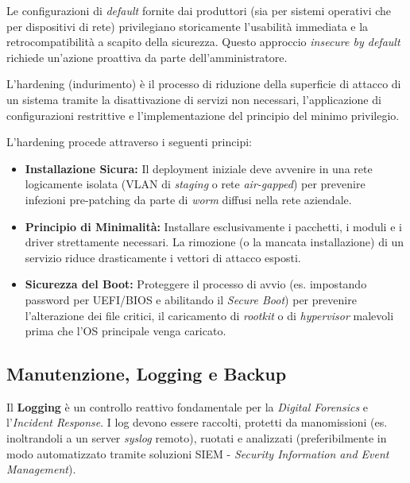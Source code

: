 \begin{notebox}
Le configurazioni di \textit{default} fornite dai produttori (sia per sistemi operativi che per dispositivi di rete) privilegiano storicamente l'usabilità immediata e la retrocompatibilità a scapito della sicurezza. Questo approccio \textit{insecure by default} richiede un'azione proattiva da parte dell'amministratore.
\end{notebox}

\begin{defbox}[Hardening]
L'hardening (indurimento) è il processo di riduzione della superficie di attacco di un sistema tramite la disattivazione di servizi non necessari, l'applicazione di configurazioni restrittive e l'implementazione del principio del minimo privilegio.
\end{defbox}

L'hardening procede attraverso i seguenti principi:
\begin{itemize}
    \item \textbf{Installazione Sicura:} Il deployment iniziale deve avvenire in una rete logicamente isolata (VLAN di \textit{staging} o rete \textit{air-gapped}) per prevenire infezioni pre-patching da parte di \textit{worm} diffusi nella rete aziendale.
    \item \textbf{Principio di Minimalità:} Installare esclusivamente i pacchetti, i moduli e i driver strettamente necessari. La rimozione (o la mancata installazione) di un servizio riduce drasticamente i vettori di attacco esposti.
    \item \textbf{Sicurezza del Boot:} Proteggere il processo di avvio (es. impostando password per UEFI/BIOS e abilitando il \textit{Secure Boot}) per prevenire l'alterazione dei file critici, il caricamento di \textit{rootkit} o di \textit{hypervisor} malevoli prima che l'OS principale venga caricato.
\end{itemize}

\subsection{Manutenzione, Logging e Backup}
Il \textbf{Logging} è un controllo reattivo fondamentale per la \textit{Digital Forensics} e l'\textit{Incident Response}. I log devono essere raccolti, protetti da manomissioni (es. inoltrandoli a un server \textit{syslog} remoto), ruotati e analizzati (preferibilmente in modo automatizzato tramite soluzioni SIEM - \textit{Security Information and Event Management}). 

